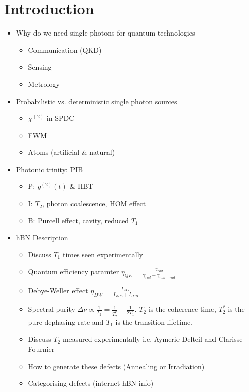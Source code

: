 \section{Introduction}

\begin{itemize}
    \item Why do we need single photons for quantum technologies 
    \begin{itemize}
        \item Communication (QKD)
        \item Sensing
        \item Metrology
    \end{itemize}
    \item Probabilistic vs. deterministic single photon sources
    \begin{itemize}
        \item $\chi^{(2)}$ in SPDC
        \item FWM
        \item Atoms (artificial \& natural)
    \end{itemize}
    \item Photonic trinity: PIB
    \begin{itemize}
        \item P: $g^{(2)}(t)$ \& HBT
        \item I: $T_2$, photon coalescence, HOM effect
        \item B: Purcell effect, cavity, reduced $T_1$  
    \end{itemize}
    \item hBN Description
    \begin{itemize}
        \item Discuss $T_1$ times seen experimentally
        \item Quantum efficiency paramter $\eta_{QE}=\frac{\gamma_{rad}}{\gamma_{rad} + \gamma_{non-rad}}$
        \item Debye-Weller effect $\eta_{DW}=\frac{I_{ZPL}}{I_{ZPL}+I_{PSB}}$
        \item Spectral purity $\Delta \nu \propto \frac{1}{T_2}=\frac{1}{T_2^*}+\frac{1}{2T_1}$. $T_2$ is the coherence time, $T_2^*$ is the pure dephasing rate and $T_1$ is the transition lifetime.
        \item Discuss $T_2$ measured experimentally i.e. Aymeric Delteil and Clarisse Fournier
        \item How to generate these defects (Annealing or Irradiation)
        \item Categorising defects (internet hBN-info)
    \end{itemize}
\end{itemize}

